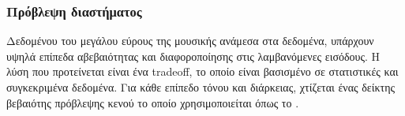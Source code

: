 \subsubsection{Πρόβλεψη διαστήματος}
Δεδομένου του μεγάλου εύρους της μουσικής ανάμεσα στα δεδομένα, υπάρχουν υψηλά επίπεδα αβεβαιότητας και διαφοροποίησης στις λαμβανόμενες εισόδους. Η λύση που προτείνεται είναι ένα tradeoff, το οποίο είναι βασισμένο σε στατιστικές και συγκεκριμένα δεδομένα. Για κάθε επίπεδο τόνου και διάρκειας, χτίζεται ένας δείκτης βεβαιότης πρόβλεψης κενού το οποίο χρησιμοποιείται όπως το .